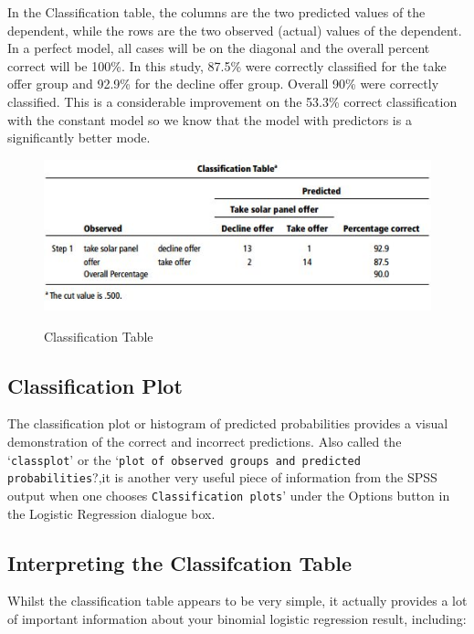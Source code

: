 \documentclass[a4paper,12pt]{article}
\begin{document}
In the Classification table, the columns are the two predicted values of the dependent, while the rows are the two observed (actual) values of the dependent. In a perfect model, all cases will be on the diagonal and the
overall percent correct will be 100\%. In this study, 87.5\% were correctly classified for the take offer group and 92.9\% for the decline offer group. Overall 90\% were correctly classified. This is a considerable improvement on the 53.3\% correct classification with the constant model so we know that the model with predictors is a significantly better mode.
\begin{figure}[h!]
	\begin{center}
		\includegraphics[scale=0.6]{images/Logistic7}\\
		\caption{Classification Table}
	\end{center}
\end{figure}

\subsection{Classification Plot} 
The classification plot or histogram of predicted probabilities
provides a visual demonstration of the correct and incorrect predictions. Also called the `\texttt{classplot}' or the `\texttt{plot of observed groups and predicted probabilities}?,it is another very useful piece of information from the SPSS output when one chooses
\texttt{Classification plots}' under the Options button in the Logistic Regression dialogue box.

\subsection{Interpreting the Classifcation Table}
Whilst the classification table appears to be very simple, it actually provides a lot of important information about your binomial logistic regression result, including:
\end{document}
